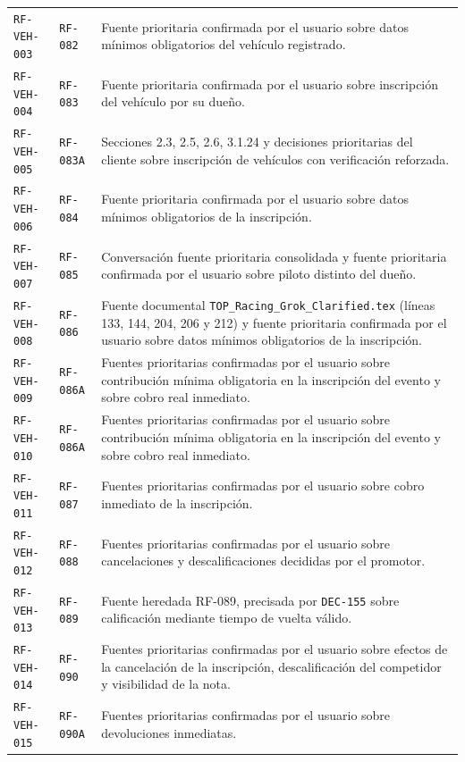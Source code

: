 \documentclass[10pt,letterpaper]{article}
\begin{document}
\begin{landscape}
\begin{longtable}{P{2.7cm}P{2.6cm}P{15.7cm}}
\texttt{RF-VEH-003} & \texttt{RF-082} & Fuente prioritaria confirmada por el usuario sobre datos mínimos obligatorios del vehículo registrado.\\
\texttt{RF-VEH-004} & \texttt{RF-083} & Fuente prioritaria confirmada por el usuario sobre inscripción del vehículo por su dueño.\\
\texttt{RF-VEH-005} & \texttt{RF-083A} & Secciones 2.3, 2.5, 2.6, 3.1.24 y decisiones prioritarias del cliente sobre inscripción de vehículos con verificación reforzada.\\
\texttt{RF-VEH-006} & \texttt{RF-084} & Fuente prioritaria confirmada por el usuario sobre datos mínimos obligatorios de la inscripción.\\
\texttt{RF-VEH-007} & \texttt{RF-085} & Conversación fuente prioritaria consolidada y fuente prioritaria confirmada por el usuario sobre piloto distinto del dueño.\\
\texttt{RF-VEH-008} & \texttt{RF-086} & Fuente documental \texttt{TOP\_Racing\_Grok\_Clarified.tex} (líneas 133, 144, 204, 206 y 212) y fuente prioritaria confirmada por el usuario sobre datos mínimos obligatorios de la inscripción.\\
\texttt{RF-VEH-009} & \texttt{RF-086A} & Fuentes prioritarias confirmadas por el usuario sobre contribución mínima obligatoria en la inscripción del evento y sobre cobro real inmediato.\\
\texttt{RF-VEH-010} & \texttt{RF-086A} & Fuentes prioritarias confirmadas por el usuario sobre contribución mínima obligatoria en la inscripción del evento y sobre cobro real inmediato.\\
\texttt{RF-VEH-011} & \texttt{RF-087} & Fuentes prioritarias confirmadas por el usuario sobre cobro inmediato de la inscripción.\\
\texttt{RF-VEH-012} & \texttt{RF-088} & Fuentes prioritarias confirmadas por el usuario sobre cancelaciones y descalificaciones decididas por el promotor.\\
\texttt{RF-VEH-013} & \texttt{RF-089} & Fuente heredada RF-089, precisada por \texttt{DEC-155} sobre calificación mediante tiempo de vuelta válido.\\
\texttt{RF-VEH-014} & \texttt{RF-090} & Fuentes prioritarias confirmadas por el usuario sobre efectos de la cancelación de la inscripción, descalificación del competidor y visibilidad de la nota.\\
\texttt{RF-VEH-015} & \texttt{RF-090A} & Fuentes prioritarias confirmadas por el usuario sobre devoluciones inmediatas.\\

\end{longtable}
\end{landscape}
\end{document}
